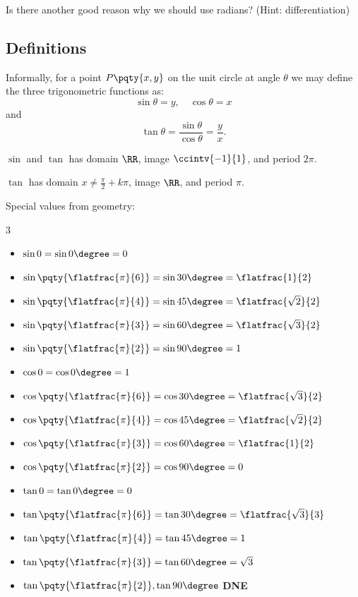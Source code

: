 \documentclass{article}
\begin{document}
\begin{problem}
    Is there another good reason why we should use radians? (Hint: differentiation)
\end{problem}

\subsection{Definitions}

Informally, for a point \(P\pqty{x, y}\) on the unit circle at angle \(\theta\) we may define the three trigonometric functions as:
\[
    \sin \theta = y, \quad \cos \theta = x
\]
and
\[
    \tan \theta = \frac{\sin \theta}{\cos \theta} = \frac{y}{x}.
\]

\(\sin\) and \(\tan\) has domain \(\RR\), image \(\ccintv{-1}{1}\), and period \(2 \pi\).

\(\tan\) has domain \(x \neq \frac{\pi}{2} + k \pi\), image \(\RR\), and period \(\pi\).

Special values from geometry:
\begin{multicols}{3}
    \begin{itemize}
        \item \(\sin 0 = \sin 0 \degree = 0\)
        \item \(\sin \pqty{\flatfrac{\pi}{6}} = \sin 30 \degree = \flatfrac{1}{2}\)
        \item \(\sin \pqty{\flatfrac{\pi}{4}} = \sin 45 \degree = \flatfrac{\sqrt{2}}{2}\)
        \item \(\sin \pqty{\flatfrac{\pi}{3}} = \sin 60 \degree = \flatfrac{\sqrt{3}}{2}\)
        \item \(\sin \pqty{\flatfrac{\pi}{2}} = \sin 90 \degree = 1\)
        \item \(\cos 0 = \cos 0 \degree = 1\)
        \item \(\cos \pqty{\flatfrac{\pi}{6}} = \cos 30 \degree = \flatfrac{\sqrt{3}}{2}\)
        \item \(\cos \pqty{\flatfrac{\pi}{4}} = \cos 45 \degree = \flatfrac{\sqrt{2}}{2}\)
        \item \(\cos \pqty{\flatfrac{\pi}{3}} = \cos 60 \degree = \flatfrac{1}{2}\)
        \item \(\cos \pqty{\flatfrac{\pi}{2}} = \cos 90 \degree = 0\)
        \item \(\tan 0 = \tan 0 \degree = 0\)
        \item \(\tan \pqty{\flatfrac{\pi}{6}} = \tan 30 \degree = \flatfrac{\sqrt{3}}{3}\)
        \item \(\tan \pqty{\flatfrac{\pi}{4}} = \tan 45 \degree = 1\)
        \item \(\tan \pqty{\flatfrac{\pi}{3}} = \tan 60 \degree = \sqrt{3}\)
        \item \(\tan \pqty{\flatfrac{\pi}{2}}, \tan 90 \degree\) \textbf{DNE}
    \end{itemize}
\end{multicols}
\end{document}
